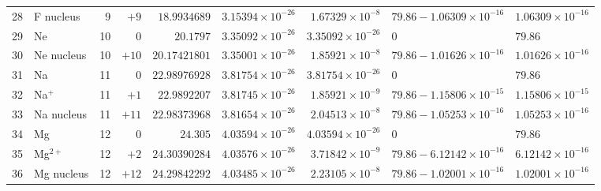 {\begin{tabular}{@{}r l r r r r r l l@{}}
28 & F nucleus & 9 & $+9$ & $18.9934689$ & $3.15394{\times}10^{-26}$ & $1.67329{\times}10^{-8}$ & $79.86 - 1.06309{\times}10^{-16}$ & $1.06309{\times}10^{-16}$ \\
29 & Ne & 10 & $0$ & $20.1797$ & $3.35092{\times}10^{-26}$ & $3.35092{\times}10^{-26}$ & $0$ & $79.86$ \\
30 & Ne nucleus & 10 & $+10$ & $20.17421801$ & $3.35001{\times}10^{-26}$ & $1.85921{\times}10^{-8}$ & $79.86 - 1.01626{\times}10^{-16}$ & $1.01626{\times}10^{-16}$ \\
31 & Na & 11 & $0$ & $22.98976928$ & $3.81754{\times}10^{-26}$ & $3.81754{\times}10^{-26}$ & $0$ & $79.86$ \\
32 & Na$^{+}$ & 11 & $+1$ & $22.9892207$ & $3.81745{\times}10^{-26}$ & $1.85921{\times}10^{-9}$ & $79.86 - 1.15806{\times}10^{-15}$ & $1.15806{\times}10^{-15}$ \\
33 & Na nucleus & 11 & $+11$ & $22.98373968$ & $3.81654{\times}10^{-26}$ & $2.04513{\times}10^{-8}$ & $79.86 - 1.05253{\times}10^{-16}$ & $1.05253{\times}10^{-16}$ \\
34 & Mg & 12 & $0$ & $24.305$ & $4.03594{\times}10^{-26}$ & $4.03594{\times}10^{-26}$ & $0$ & $79.86$ \\
35 & Mg$^{2+}$ & 12 & $+2$ & $24.30390284$ & $4.03576{\times}10^{-26}$ & $3.71842{\times}10^{-9}$ & $79.86 - 6.12142{\times}10^{-16}$ & $6.12142{\times}10^{-16}$ \\
36 & Mg nucleus & 12 & $+12$ & $24.29842292$ & $4.03485{\times}10^{-26}$ & $2.23105{\times}10^{-8}$ & $79.86 - 1.02001{\times}10^{-16}$ & $1.02001{\times}10^{-16}$ \\
\bottomrule
\end{tabular}}
\endgroup
\clearpage
\begingroup\scriptsize\setlength{\extrarowheight}{0pt}\setlength{\tabcolsep}{3.2pt}\renewcommand{\arraystretch}{1.02}
